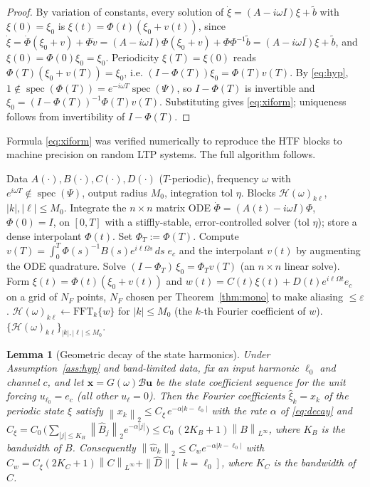 \documentclass{amsart}
\newtheorem{lemma}{Lemma}
\theoremstyle{definition}
\DeclareMathOperator{\spec}{spec}
\newcommand{\norm}[1]{\left\lVert#1\right\rVert}
\newcommand{\Bcal}{\mathcal{B}}
\newcommand{\Hcal}{\mathcal{H}}
\begin{document}
\begin{proof}
By variation of constants, every solution of $\dot\xi=(A-i\omega I)\xi+\tilde b$
with $\xi(0)=\xi_0$ is $\xi(t)=\Phi(t)(\xi_0+v(t))$, since
$\dot\xi=\dot\Phi(\xi_0+v)+\Phi\dot v
=(A-i\omega I)\Phi(\xi_0+v)+\Phi\Phi^{-1}\tilde b=(A-i\omega I)\xi+\tilde b$, and
$\xi(0)=\Phi(0)\xi_0=\xi_0$. Periodicity $\xi(T)=\xi(0)$ reads
$\Phi(T)(\xi_0+v(T))=\xi_0$, i.e. $(I-\Phi(T))\xi_0=\Phi(T)v(T)$. By
\eqref{eq:hyp}, $1\notin\spec(\Phi(T))=e^{-i\omega T}\spec(\Psi)$, so $I-\Phi(T)$
is invertible and $\xi_0=(I-\Phi(T))^{-1}\Phi(T)v(T)$. Substituting gives
\eqref{eq:xiform}; uniqueness follows from invertibility of $I-\Phi(T)$.
\end{proof}

Formula \eqref{eq:xiform} was verified numerically to reproduce the HTF blocks
to machine precision on random LTP systems. The full algorithm follows.

\begin{algorithm}[H]
\caption{Monodromy/Floquet HTF at a single frequency $\omega$}\label{alg:mono}
\begin{algorithmic}[1]
\Require Data $A(\cdot),B(\cdot),C(\cdot),D(\cdot)$ ($T$-periodic), frequency $\omega$
with $e^{i\omega T}\notin\spec(\Psi)$, output radius $M_0$, integration tol $\eta$.
\Ensure Blocks $\Hcal(\omega)_{k\ell}$, $|k|,|\ell|\le M_0$.
\State Integrate the $n\times n$ matrix ODE $\dot\Phi=(A(t)-i\omega I)\Phi$,
$\Phi(0)=I$, on $[0,T]$ with a stiffly-stable, error-controlled solver (tol
$\eta$); store a dense interpolant $\Phi(t)$. Set $\Phi_T:=\Phi(T)$.
  \State Compute $v(T)=\int_0^T\Phi(s)^{-1}B(s)e^{i\ell\Omega s}\,ds\;e_c$ and the
  interpolant $v(t)$ by augmenting the ODE quadrature.
  \State Solve $(I-\Phi_T)\,\xi_0=\Phi_T v(T)$ (an $n\times n$ linear solve).
  \State Form $\xi(t)=\Phi(t)(\xi_0+v(t))$ and
  $w(t)=C(t)\xi(t)+D(t)e^{i\ell\Omega t}e_c$ on a grid of $N_F$ points,
  $N_F$ chosen per Theorem~\ref{thm:mono} to make aliasing $\le\varepsilon$.
  \State $\Hcal(\omega)_{k\ell}\gets \mathrm{FFT}_k\{w\}$ for $|k|\le M_0$
  (the $k$-th Fourier coefficient of $w$).
\EndFor
\State \Return $\{\Hcal(\omega)_{k\ell}\}_{|k|,|\ell|\le M_0}$.
\end{algorithmic}
\end{algorithm}

\begin{lemma}[Geometric decay of the state harmonics]\label{lem:coldecay}
Under Assumption~\ref{ass:hyp} and band-limited data, fix an input harmonic
$\ell_0$ and channel $c$, and let $\mathbf x=G(\omega)\Bcal\mathbf u$ be the state
coefficient sequence for the unit forcing $u_{\ell_0}=e_c$ (all other
$u_\ell=0$). Then the Fourier coefficients $\hat\xi_k=x_k$ of the periodic state
$\xi$ satisfy $\norm{x_k}_2\le C_\xi\,e^{-\alpha|k-\ell_0|}$ with the rate
$\alpha$ of \eqref{eq:decay} and
$C_\xi=C_0\,\big(\sum_{|j|\le K_B}\norm{\hat B_j}_2 e^{-\alpha|j|}\big)
\le C_0\,(2K_B+1)\norm{B}_{L^\infty}$, where $K_B$ is the bandwidth of $B$.
Consequently $\norm{\hat w_k}_2\le C_w e^{-\alpha|k-\ell_0|}$ with
$C_w=C_\xi(2K_C+1)\norm{C}_{L^\infty}+\|\hat D\|\,[\,k=\ell_0]$, where $K_C$ is the
bandwidth of $C$.
\end{lemma}
\end{document}

